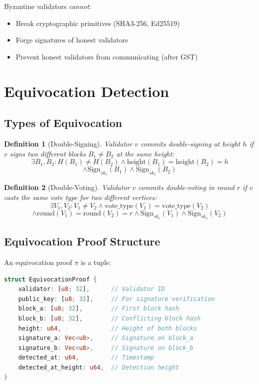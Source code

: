 \documentclass[11pt,a4paper]{article}
\newtheorem{definition}{Definition}
\begin{document}
Byzantine validators \emph{cannot}:
\begin{itemize}
    \item Break cryptographic primitives (SHA3-256, Ed25519)
    \item Forge signatures of honest validators
    \item Prevent honest validators from communicating (after GST)
\end{itemize}

\section{Equivocation Detection}

\subsection{Types of Equivocation}

\begin{definition}[Double-Signing]
Validator $v$ commits double-signing at height $h$ if $v$ signs two different blocks $B_1 \neq B_2$ at the same height:
$$\exists B_1, B_2: H(B_1) \neq H(B_2) \land \text{height}(B_1) = \text{height}(B_2) = h$$
$$\land \text{Sign}_{sk_v}(B_1) \land \text{Sign}_{sk_v}(B_2)$$
\end{definition}

\begin{definition}[Double-Voting]
Validator $v$ commits double-voting in round $r$ if $v$ casts the same vote type for two different vertices:
$$\exists V_1, V_2: V_1 \neq V_2 \land \text{vote\_type}(V_1) = \text{vote\_type}(V_2)$$
$$\land \text{round}(V_1) = \text{round}(V_2) = r \land \text{Sign}_{sk_v}(V_1) \land \text{Sign}_{sk_v}(V_2)$$
\end{definition}

\subsection{Equivocation Proof Structure}

An equivocation proof $\pi$ is a tuple:

\begin{lstlisting}[language=Rust,caption={Equivocation Proof Structure}]
struct EquivocationProof {
    validator: [u8; 32],      // Validator ID
    public_key: [u8; 32],     // For signature verification
    block_a: [u8; 32],        // First block hash
    block_b: [u8; 32],        // Conflicting block hash
    height: u64,              // Height of both blocks
    signature_a: Vec<u8>,     // Signature on block_a
    signature_b: Vec<u8>,     // Signature on block_b
    detected_at: u64,         // Timestamp
    detected_at_height: u64,  // Detection height
}
\end{lstlisting}
\end{document}
